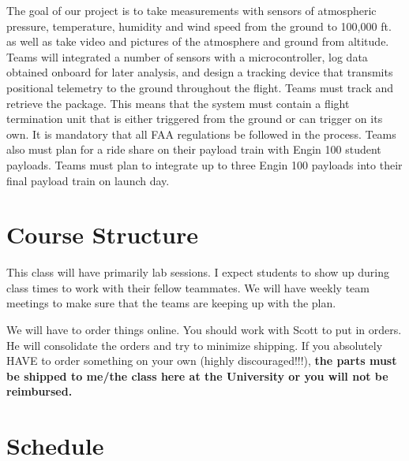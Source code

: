\documentclass[11pt]{article}
\begin{document}
The goal of our project is to take measurements with sensors of
atmospheric pressure, temperature, humidity and wind speed from the
ground to 100,000 ft. as well as take video and pictures of the
atmosphere and ground from altitude. Teams will integrated a number of
sensors with a microcontroller, log data obtained onboard for later
analysis, and design a tracking device that transmits positional
telemetry to the ground throughout the flight.  Teams must track and
retrieve the package.  This means that the system must contain a
flight termination unit that is either triggered from the ground or
can trigger on its own.  It is mandatory that all FAA regulations be
followed in the process.  Teams also must plan for a ride share on
their payload train with Engin 100 student payloads.  Teams must plan
to integrate up to three Engin 100 payloads into their final payload
train on launch day.

\section{Course Structure}

This class will have primarily lab sessions. I expect students to show
up during class times to work with their fellow teammates. We will
have weekly team meetings to make sure that the teams are keeping up
with the plan.

We will have to order things online. You should work with Scott to put
in orders.  He will consolidate the orders and try to minimize
shipping. If you absolutely HAVE to order something on your own
(highly discouraged!!!), {\bf the parts must be shipped to me/the class
here at the University or you will not be reimbursed.}


\section{Schedule}
\end{document}
